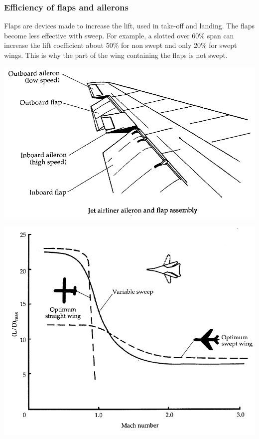 \subsubsection{Efficiency of flaps and ailerons}
	Flaps are devices made to increase the lift, used in take-off and landing. The flaps become less effective with sweep. For example, a slotted over 60\% span can increase the lift coefficient about 50\% for non swept and only 20\% for swept wings. This is why the part of the wing containing the flaps is not swept.  
	
	\begin{center}
	\begin{minipage}{0.33\textwidth}
	\includegraphics[scale=0.3]{ch7/11}
	\label{ch7/11}
	\end{minipage}
	\begin{minipage}{0.25\textwidth}
	\includegraphics[scale=0.3]{ch7/12}

\end{minipage}
\end{center}

